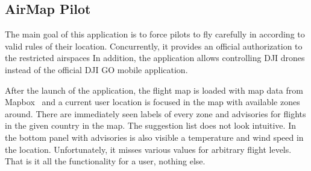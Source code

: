 \subsection{AirMap Pilot}\label{subsec:airmap-pilot}
The main goal of this application is to force pilots to fly carefully in according to valid rules of their location.
Concurrently, it provides an official authorization to the restricted airspaces
In addition, the application allows controlling DJI drones instead of the official DJI GO mobile application.

After the launch of the application, the flight map is loaded with map data from Mapbox~\cite{mapBox} and a current user location is focused in the map with available zones around.
There are immediately seen labels of every zone and advisories for flights in the given country in the map.
The suggestion list does not look intuitive.
In the bottom panel with advisories is also visible a temperature and wind speed in the location.
Unfortunately, it misses various values for arbitrary flight levels.
That is it all the functionality for a user, nothing else.

